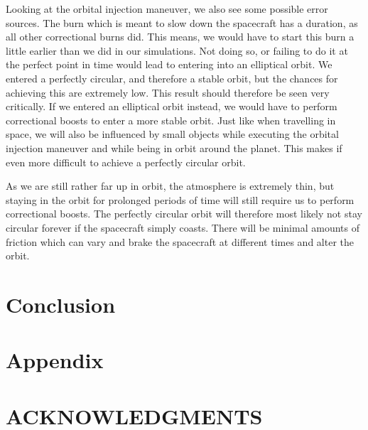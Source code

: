 \documentclass[reprint,english,notitlepage]{revtex4-2}
\begin{document}
Looking at the orbital injection maneuver, we also see some possible error sources.
The burn which is meant to slow down the spacecraft has a duration, as all other correctional burns did.
This means, we would have to start this burn a little earlier than we did in our simulations.
Not doing so, or failing to do it at the perfect point in time would lead to entering into an elliptical orbit.
We entered a perfectly circular, and therefore a stable orbit, but the chances for achieving this are extremely low.
This result should therefore be seen very critically.
If we entered an elliptical orbit instead, we would have to perform correctional boosts to enter a more stable orbit.
Just like when travelling in space, we will also be influenced by small objects while executing the orbital injection maneuver and while being in orbit around the planet.
This makes if even more difficult to achieve a perfectly circular orbit.

As we are still rather far up in orbit, the atmosphere is extremely thin, but staying in the orbit for prolonged periods of time will still require us to perform correctional boosts.
The perfectly circular orbit will therefore most likely not stay circular forever if the spacecraft simply coasts.
There will be minimal amounts of friction which can vary and brake the spacecraft at different times and alter the orbit.



\section{Conclusion} \label{sec: conclusion}

\section{Appendix} \label{sec: appendix}

\section*{ACKNOWLEDGMENTS}

\newpage
\end{document}
